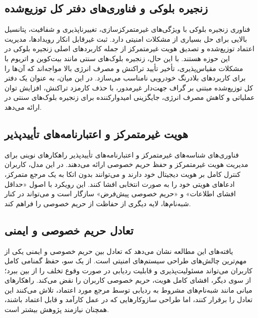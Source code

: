 \documentclass[12pt,a4paper]{article}
\begin{document}
\subsection{زنجیره بلوکی و فناوری‌های دفتر کل توزیع‌شده}
فناوری زنجیره بلوکی با ویژگی‌های غیرمتمرکزسازی، تغییرناپذیری و شفافیت، پتانسیل بالایی برای حل بسیاری از مشکلات امنیتی  دارد. ثبت غیرقابل انکار رویدادها، مدیریت اعتماد توزیع‌شده و تصدیق هویت غیرمتمرکز از جمله کاربردهای اصلی زنجیره بلوکی در این حوزه هستند. با این حال، زنجیره بلوک‌های سنتی مانند بیت‌کوین و اتریوم با مشکلات مقیاس‌پذیری، تأخیر تأیید تراکنش و مصرف انرژی بالا مواجه‌اند که آن‌ها را برای کاربردهای بلادرنگ خودرویی نامناسب می‌سازد. در این میان،  به عنوان یک دفتر کل توزیع‌شده مبتنی بر گراف جهت‌دار غیرمدور، با حذف کارمزد تراکنش، افزایش توان عملیاتی و کاهش مصرف انرژی، جایگزینی امیدوارکننده برای زنجیره بلوک‌های سنتی در  ارائه می‌دهد.

\subsection{هویت غیرمتمرکز و اعتبارنامه‌های تأییدپذیر}
فناوری‌های شناسه‌های غیرمتمرکز و اعتبارنامه‌های تأییدپذیر راهکارهای نوینی برای مدیریت هویت غیرمتمرکز و حفظ حریم خصوصی ارائه می‌دهند. در این مدل، کاربران کنترل کامل بر هویت دیجیتال خود دارند و می‌توانند بدون اتکا به یک مرجع متمرکز، ادعاهای هویتی خود را به صورت انتخابی افشا کنند. این رویکرد با اصول «حداقل افشای اطلاعات» و «حریم خصوصی پیش‌فرض» سازگار است و می‌تواند در کنار شبه‌نام‌ها، لایه دیگری از حفاظت از حریم خصوصی را فراهم کند.

\subsection{تعادل حریم خصوصی و ایمنی}
یافته‌های این مطالعه نشان می‌دهد که تعادل بین حریم خصوصی و ایمنی یکی از مهم‌ترین چالش‌های طراحی سیستم‌های امنیتی  است. از یک سو، حفظ گمنامی کامل کاربران می‌تواند مسئولیت‌پذیری و قابلیت ردیابی در صورت وقوع تخلف را از بین ببرد؛ از سوی دیگر، افشای کامل هویت، حریم خصوصی کاربران را نقض می‌کند. راهکارهای میانی مانند شبه‌نام‌های مشروط به ردیابی توسط مرجع مورد اعتماد، تلاش می‌کنند این تعادل را برقرار کنند، اما طراحی سازوکارهایی که در عمل کارآمد و قابل اعتماد باشند، همچنان نیازمند پژوهش بیشتر است.
\end{document}
